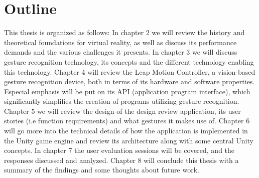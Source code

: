 \section{Outline}
This thesis is organized as follows: In chapter 2 we will review the history and theoretical foundations for virtual reality, as well as discuss its performance demands
and the various challenges it presents. In chapter 3 we will discuss gesture recognition technology, its concepts and the different technology enabling this technology.
Chapter 4 will review the Leap Motion Controller, a vision-based gesture recognition device, both in terms of its hardware and software properties. Especial
emphasis will be put on its API (application program interface), which significantly simplifies the creation of programs utilizing gesture recognition.
Chapter 5 we will review the design of the design review application, its user stories (i.e function requirements) and what gestures it makes use of.
Chapter 6 will go more into the technical details of how the application is implemented in the Unity game engine and review its architecture along with some central Unity concepts.
In chapter 7 the user evaluation sessions will be covered, and the responses discussed and analyzed.
Chapter 8 will conclude this thesis with a summary of the findings and some thoughts about future work.